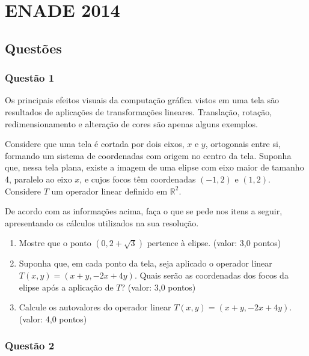 \documentclass{report}
\begin{document}
\chapter{ENADE 2014}

\section{\color{blue} Quest\~oes}

\subsection{\color{blue} Quest\~ao 1}

Os principais efeitos visuais da computa\c c\~ao gr\'afica vistos em uma tela s\~ao resultados de aplica\c c\~oes de transforma\c c\~oes lineares. Transla\c c\~ao, rota\c c\~ao, redimensionamento e altera\c c\~ao de cores s\~ao apenas alguns exemplos.

Considere que uma tela \'e cortada por dois eixos, $x$ e $y$, ortogonais entre si, formando um sistema de coordenadas com origem no centro da tela. Suponha que, nessa tela plana, existe a imagem de uma elipse com eixo maior de tamanho 4, paralelo ao eixo $x$, e cujos focos t\^em coordenadas $(-1,2)$ e $(1,2)$. Considere $T$ um operador linear definido em $\mathbb R^2$.

De acordo com as informa\c c\~oes acima, fa\c ca o que se pede nos itens a seguir, apresentando os c\'alculos utilizados na sua resolu\c c\~ao.

\begin{enumerate}

\item[(a)] Mostre que o ponto $(0,2+\sqrt{3})$ pertence \`a elipse. (valor: 3,0 pontos)

\item[(b)] Suponha que, em cada ponto da tela, seja aplicado o operador linear $T(x,y)=(x+y,-2x+4y)$. Quais ser\~ao as coordenadas dos focos da elipse ap\'os a aplica\c c\~ao de $T$? (valor: 3,0 pontos)

\item[(c)] Calcule os autovalores do operador linear $T(x,y)=(x+y,-2x+4y)$. (valor: 4,0 pontos)

\end{enumerate}
\subsection{\color{blue} Quest\~ao 2}
\end{document}
